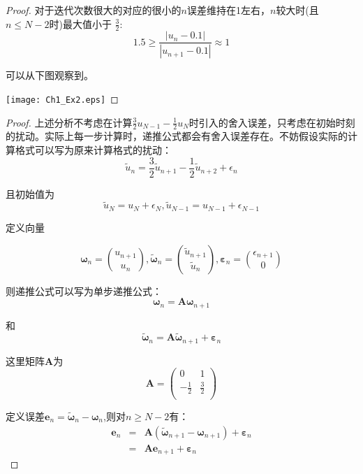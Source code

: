 \documentclass{ctexart}
\begin{document}
\begin{enumerate}
\begin{proof}
对于迭代次数很大的对应的很小的\(n\)误差维持在1左右，\(n\)较大时(且\(n \leq N-2\)时)最大值小于
\(  \frac{3}{2}\):
\[ 1.5 \geq  \frac{|u_{n}-0.1|}{|u_{n+1}-0.1|} \approx 1\]

可以从下图观察到。

\centerline{\texttt{[image: Ch1\_Ex2.eps]}}

 \end{proof}
 
 
 \begin{proof}
 
 上述分析不考虑在计算\(\frac{3}{2}u_{N-1}-\frac{1}{2}u_N\)时引入的舍入误差，只考虑在初始时刻的扰动。实际上每一步计算时，递推公式都会有舍入误差存在。不妨假设实际的计算格式可以写为原来计算格式的扰动：
 \[\tilde{u}_n=\frac{3}{2}\tilde{u}_{n+1}-\frac{1}{2}\tilde{u}_{n+2}+\epsilon_n\]
 
 且初始值为
 \[ \tilde{u}_N=u_N+\epsilon_N, \tilde{u}_{N-1}=u_{N-1}+\epsilon_{N-1}\]
 
 定义向量
 
 \[\boldsymbol{ \omega}_n={u_{n+1}\choose u_n}, \tilde{\boldsymbol{ \omega}}_n={\tilde{u}_{n+1}\choose \tilde{u}_n},
 \boldsymbol{\varepsilon}_n={\epsilon_{n+1}\choose 0} \]
  
  则递推公式可以写为单步递推公式：
 \[ \boldsymbol{ \omega}_n=\boldsymbol{A}\boldsymbol{ \omega}_{n+1}\]
 
 和
 \[\tilde{\boldsymbol{ \omega}}_n=\boldsymbol{A}\tilde{\boldsymbol{ \omega}}_{n+1}+\boldsymbol{\varepsilon}_n\]
 
 这里矩阵\(\boldsymbol{A}\)为
 \[\boldsymbol{A}=\left(                 %
  \begin{array}{cc}   %
    0 & 1 \\  %
    -\frac{1}{2} & \frac{3}{2} \\  %
  \end{array}
\right) \]

定义误差\(\boldsymbol{e}_n=\tilde{\boldsymbol{ \omega}}_n - \boldsymbol{ \omega}_n\),则对\(n \geq N-2\)有：
\begin{eqnarray}
\boldsymbol{e}_n &=& \boldsymbol{A}(\tilde{\boldsymbol{ \omega}}_{n+1}-\boldsymbol{ \omega}_{n+1})+\boldsymbol{\varepsilon}_n \nonumber \\
      &=& \boldsymbol{A}\boldsymbol{e}_{n+1}+\boldsymbol{\varepsilon}_n \nonumber
\end{eqnarray}


\end{proof}
\end{enumerate}
\end{document}
